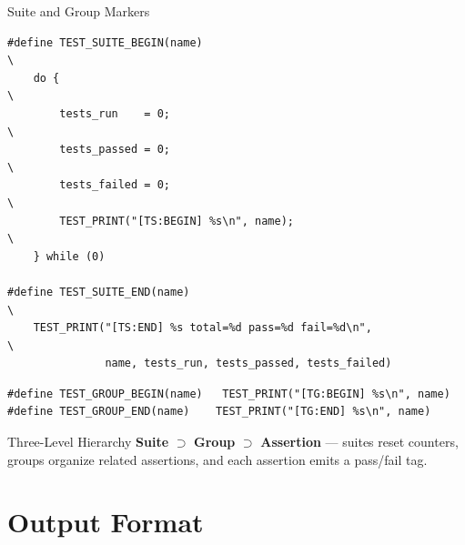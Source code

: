 \documentclass[aspectratio=169, 10pt]{beamer}
\begin{document}
\begin{frame}[fragile]{Suite and Group Markers}
\begin{lstlisting}[style=cstyle, title={Suite markers --- bracket the entire test run}]
#define TEST_SUITE_BEGIN(name)                                               \
    do {                                                                     \
        tests_run    = 0;                                                    \
        tests_passed = 0;                                                    \
        tests_failed = 0;                                                    \
        TEST_PRINT("[TS:BEGIN] %s\n", name);                                \
    } while (0)

#define TEST_SUITE_END(name)                                                 \
    TEST_PRINT("[TS:END] %s total=%d pass=%d fail=%d\n",                    \
               name, tests_run, tests_passed, tests_failed)
\end{lstlisting}

\begin{lstlisting}[style=cstyle, title={Group markers --- bracket a logical test function}]
#define TEST_GROUP_BEGIN(name)   TEST_PRINT("[TG:BEGIN] %s\n", name)
#define TEST_GROUP_END(name)    TEST_PRINT("[TG:END] %s\n", name)
\end{lstlisting}

\vspace{0.3em}
\begin{block}{Three-Level Hierarchy}
\textbf{Suite} $\supset$ \textbf{Group} $\supset$ \textbf{Assertion} ---
suites reset counters, groups organize related assertions,
and each assertion emits a pass/fail tag.
\end{block}
\end{frame}

\section{Output Format}
\end{document}
